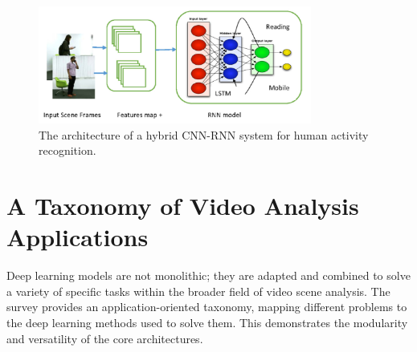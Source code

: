 \begin{figure}[H]
    \centering
    \includegraphics[width=0.8\textwidth]{archivos/figuras/recognition.jpg} 
    \caption{The architecture of a hybrid CNN-RNN system for human activity recognition.}
    \label{fig:cnn_rnn_activity}
\end{figure}

\section{A Taxonomy of Video Analysis Applications}

Deep learning models are not monolithic; they are adapted and combined to solve a variety of specific tasks within the broader field of video scene analysis. The survey provides an application-oriented taxonomy, mapping different problems to the deep learning methods used to solve them. This demonstrates the modularity and versatility of the core architectures.

